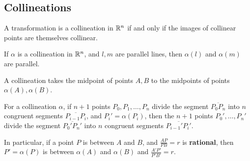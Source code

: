 \subsection{Collineations}

\begin{theorem}
    A transformation is a collineation in \(\mathbb{R}^n\) if and only if the images of collinear points are themselves collinear.
\end{theorem}

\begin{lemma}
    If \(\alpha\) is a collineation in \(\mathbb{R}^n\), and \(l, m\) are parallel lines, then \(\alpha(l)\) and \(\alpha(m)\) are parallel.
\end{lemma}

\begin{theorem}
    A collineation takes the midpoint of points \(A, B\) to the midpoints of points \(\alpha(A), \alpha(B)\).
\end{theorem}

\begin{corollary}
    For a collineation \(\alpha\), if \(n + 1\) points \(P_0, P_1, \dots, P_n\) divide the segment \(\overline{P_0P_n}\) into \(n\) congruent segments \(\overline{P_{i-1}P_i}\), and \(P_i' = \alpha(P_i)\), then the \(n + 1\) points \(P_0', \dots, P_n'\) divide the segment \(\overline{P_0'P_n'}\) into \(n\) congruent segments \(\overline{P_{i-1}'P_i'}\).

    In particular, if a point \(P\) is between \(A\) and \(B\), and \(\frac{AP}{PB} = r\) is \textbf{rational}, then \(P' = \alpha(P)\) is between \(\alpha(A)\) and \(\alpha(B)\) and \(\frac{A'P'}{P'B'} = r\).
\end{corollary}